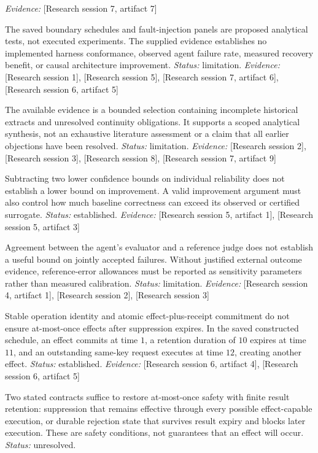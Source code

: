 \documentclass[11pt]{article}
\begin{document}
\begin{sloppypar}
\begin{description}
\textit{Evidence: }[Research session 7, artifact 7]
\item[C20] The saved boundary schedules and fault-injection panels are proposed analytical tests, not executed experiments. The supplied evidence establishes no implemented harness conformance, observed agent failure rate, measured recovery benefit, or causal architecture improvement. \textit{Status: }limitation.
\textit{Evidence: }[Research session 1], [Research session 5], [Research session 7, artifact 6], [Research session 6, artifact 5]
\item[C21] The available evidence is a bounded selection containing incomplete historical extracts and unresolved continuity obligations. It supports a scoped analytical synthesis, not an exhaustive literature assessment or a claim that all earlier objections have been resolved. \textit{Status: }limitation.
\textit{Evidence: }[Research session 2], [Research session 3], [Research session 8], [Research session 7, artifact 9]
\item[C22] Subtracting two lower confidence bounds on individual reliability does not establish a lower bound on improvement. A valid improvement argument must also control how much baseline correctness can exceed its observed or certified surrogate. \textit{Status: }established.
\textit{Evidence: }[Research session 5, artifact 1], [Research session 5, artifact 3]
\item[C23] Agreement between the agent's evaluator and a reference judge does not establish a useful bound on jointly accepted failures. Without justified external outcome evidence, reference-error allowances must be reported as sensitivity parameters rather than measured calibration. \textit{Status: }limitation.
\textit{Evidence: }[Research session 4, artifact 1], [Research session 2], [Research session 3]
\item[C13] Stable operation identity and atomic effect-plus-receipt commitment do not ensure at-most-once effects after suppression expires. In the saved constructed schedule, an effect commits at time $1$, a retention duration of $10$ expires at time $11$, and an outstanding same-key request executes at time $12$, creating another effect. \textit{Status: }established.
\textit{Evidence: }[Research session 6, artifact 4], [Research session 6, artifact 5]
\item[C14] Two stated contracts suffice to restore at-most-once safety with finite result retention: suppression that remains effective through every possible effect-capable execution, or durable rejection state that survives result expiry and blocks later execution. These are safety conditions, not guarantees that an effect will occur. \textit{Status: }unresolved.

\end{description}
\end{sloppypar}
\end{document}
